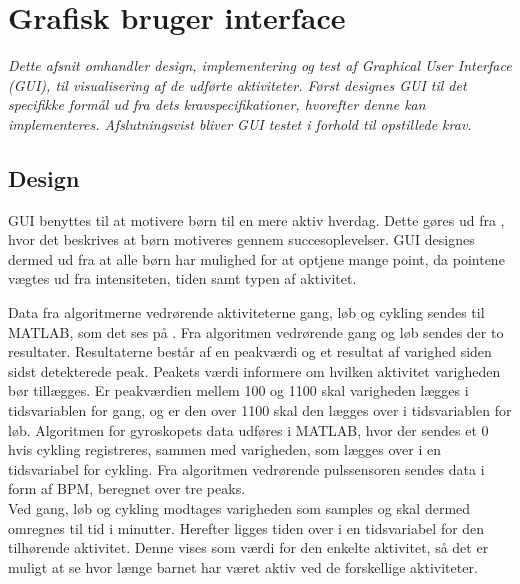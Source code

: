 \section{Grafisk bruger interface}
\textit{Dette afsnit omhandler design, implementering og test af Graphical User Interface (GUI), til visualisering af de udførte aktiviteter. Først designes GUI til det specifikke formål ud fra dets kravspecifikationer, hvorefter denne kan implementeres. Afslutningsvist bliver GUI testet i forhold til opstillede krav.}
\subsection{Design}
GUI benyttes til at motivere børn til en mere aktiv hverdag. Dette gøres ud fra , hvor det beskrives at børn motiveres gennem succesoplevelser. GUI designes dermed ud fra at alle børn har mulighed for at optjene mange point, da pointene vægtes ud fra intensiteten, tiden samt typen af aktivitet.

Data fra algoritmerne vedrørende aktiviteterne gang, løb og cykling sendes til MATLAB, som det ses på . Fra algoritmen vedrørende gang og løb sendes der to resultater. Resultaterne består af en peakværdi og et resultat af varighed siden sidst detekterede peak. Peakets værdi informere om hvilken aktivitet varigheden bør tillægges. Er peakværdien mellem 100 og 1100 skal varigheden lægges i tidsvariablen for gang, og er den over 1100 skal den lægges over i tidsvariablen for løb. Algoritmen for gyroskopets data udføres i MATLAB, hvor der sendes et 0 hvis cykling registreres, sammen med varigheden, som lægges over i en tidsvariabel for cykling. Fra algoritmen vedrørende pulssensoren sendes data i form af BPM, beregnet over tre peaks. \\
Ved gang, løb og cykling modtages varigheden som samples og skal dermed omregnes til tid i minutter. Herefter ligges tiden over i en tidsvariabel for den tilhørende aktivitet. Denne vises som værdi for den enkelte aktivitet, så det er muligt at se hvor længe barnet har været aktiv ved de forskellige aktiviteter.

